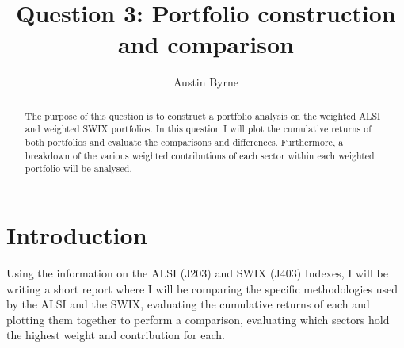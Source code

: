 \documentclass[11pt,preprint, authoryear]{elsarticle}
\numberwithin{equation}{section}
\numberwithin{figure}{section}
\numberwithin{table}{section}
\begin{document}
\begin{frontmatter}  %

\title{Question 3: Portfolio construction and comparison}





\author[Add1]{Austin Byrne}





\address[Add1]{Stellenbosch University, Stellenbosch, South Africa}


\begin{abstract}
\small{
The purpose of this question is to construct a portfolio analysis on the
weighted ALSI and weighted SWIX portfolios. In this question I will plot
the cumulative returns of both portfolios and evaluate the comparisons
and differences. Furthermore, a breakdown of the various weighted
contributions of each sector within each weighted portfolio will be
analysed.
}
\end{abstract}

\vspace{1cm}





\vspace{0.5cm}

\end{frontmatter}

\setcounter{footnote}{0}



\pagestyle{fancy}
\chead{}
\rhead{}
\lfoot{}
\lhead{}
\cfoot{}


\headsep 35pt %




\hypertarget{introduction}{%
\section{\texorpdfstring{Introduction
\label{Introduction}}{Introduction }}\label{introduction}}

Using the information on the ALSI (J203) and SWIX (J403) Indexes, I will
be writing a short report where I will be comparing the specific
methodologies used by the ALSI and the SWIX, evaluating the cumulative
returns of each and plotting them together to perform a comparison,
evaluating which sectors hold the highest weight and contribution for
each.
\end{document}
